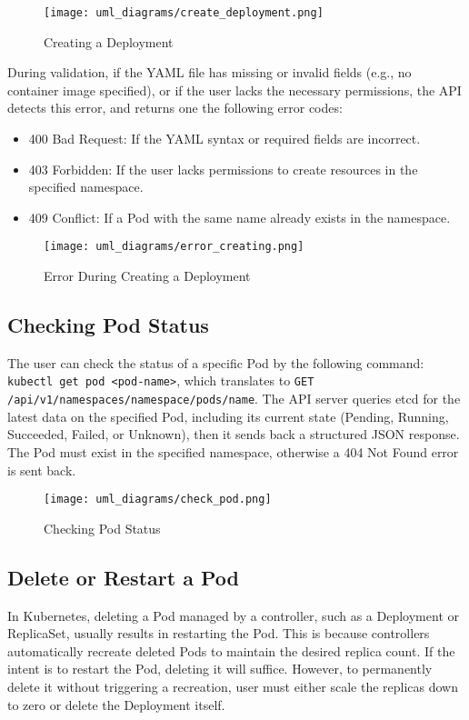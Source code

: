 \documentclass[main.tex]{subfiles}
\begin{document}
\begin{figure}[H]
    \centering
    \texttt{[image: uml\_diagrams/create\_deployment.png]}
    \caption{Creating a Deployment}
    \label{fig:create_deployment_diagram}
\end{figure}

During validation, if the YAML file has missing or invalid fields (e.g., no container image specified), or if the user lacks the necessary permissions, the API detects this error, and returns one the following error codes: 
\begin{itemize}
    \item 400 Bad Request: If the YAML syntax or required fields are incorrect.
    \item 403 Forbidden: If the user lacks permissions to create resources in the specified namespace.
    \item 409 Conflict: If a Pod with the same name already exists in the namespace.
\end{itemize}

\begin{figure}[H]
    \centering
    \texttt{[image: uml\_diagrams/error\_creating.png]}
    \caption{Error During Creating a Deployment}
    \label{fig:create_deployment_diagram}
\end{figure}



\subsection{Checking Pod Status}
The user can check the status of a specific Pod by the following command: \texttt{kubectl get pod <pod-name>}, which translates to  \texttt{GET /api/v1/namespaces/{namespace}/pods/{name}}. The API server queries etcd for the latest data on the specified Pod, including its current state (Pending, Running, Succeeded, Failed, or Unknown), then it sends back a structured JSON response.
The Pod must exist in the specified namespace, otherwise a 404 Not Found error is sent back.
\begin{figure}[H]
    \centering
    \texttt{[image: uml\_diagrams/check\_pod.png]}
    \caption{Checking Pod Status}
    \label{fig:create_deployment_diagram}
\end{figure}

\subsection{Delete or Restart a Pod}
In Kubernetes, deleting a Pod managed by a controller, such as a Deployment or ReplicaSet, usually results in restarting the Pod. This is because controllers automatically recreate deleted Pods to maintain the desired replica count. If the intent is to restart the Pod, deleting it will suffice. However, to permanently delete it without triggering a recreation, user must either scale the replicas down to zero or delete the Deployment itself.
\end{document}
